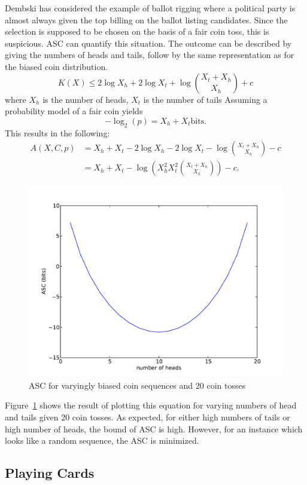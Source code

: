 Dembski \citep{Dembski1998} has considered the example of ballot rigging where a political party is almost always given the top billing on the ballot listing candidates.
Since the selection is supposed to be chosen on the basis of a fair coin toss, this is suspicious.
ASC can quantify this situation.
The outcome can be described by giving the numbers of heads and tails, follow by the same representation as for the biased coin distribution.
\begin{equation}
    K(X) \leq 2 \log X_h + 2 \log X_t + \log {X_t + X_h \choose X_h} + c
\end{equation} where $X_h$ is the number of heads, $X_t$ is the number of tails
Assuming a probability model of a fair coin yields
\begin{equation}
    -\log_2(p) = X_h + X_t \mbox{bits.}
\end{equation}
This results in the following:
\begin{align}
    A(X,C,p) &= X_h + X_t - 2 \log X_h -  2 \log X_t - \log {X_t + X_h \choose X_h} - c \nonumber \\
    &= X_h + X_t - \log \left( X_h^2 X_t^2 {X_t + X_h \choose X_h} \right) - c \mbox{.}
\end{align}
\begin{figure}
    \begin{center}
        \includegraphics[width=.5\textwidth]{EwertCoin}
    \end{center}
    \caption{ASC for varyingly biased coin sequences and 20 coin tosses}
    \label{fig_coins}
\end{figure}
Figure~\ref{fig_coins} shows the result of plotting this equation for varying numbers of head and tails given 20 coin tosses.
As expected, for either high numbers of tails or high number of heads, the bound of ASC is high.
However, for an instance which looks like a random sequence, the ASC is minimized.


\subsection{Playing Cards}

